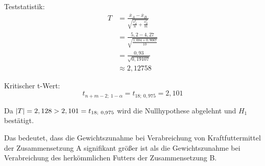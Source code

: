 \documentclass[main.tex]{subfiles}
\begin{document}
Teststatistik:
$$\begin{aligned}
	T &= \frac{\overline{x}_A - \overline{x}_B}{\sqrt{\frac{s_A^2}{n} + \frac{s_B^2}{m}}} \\[3mm]
	&= \frac{5,2 - 4,27}{\sqrt{\frac{1,004 + 0,9067}{10}}} \\[3mm]
	&= \frac{0,93}{\sqrt{0,19107}} \\[3mm]
	&\approx 2,12758
\end{aligned}
$$

Kritischer t-Wert:
$$
	t_{n+m-2;\ 1-\alpha} = t_{18;\ 0,975} = 2,101
$$

Da $\abs{T} = 2,128 > 2,101 = t_{18;\ 0,975}$ wird die Nullhypothese abgelehnt und $H_1$ bestätigt.

Das bedeutet, dass die Gewichtszunahme bei Verabreichung von Kraftfuttermittel der Zusammensetzung A signifikant größer ist als die Gewichtszunahme bei Verabreichung des herkömmlichen Futters der Zusammensetzung B.
\end{document}
